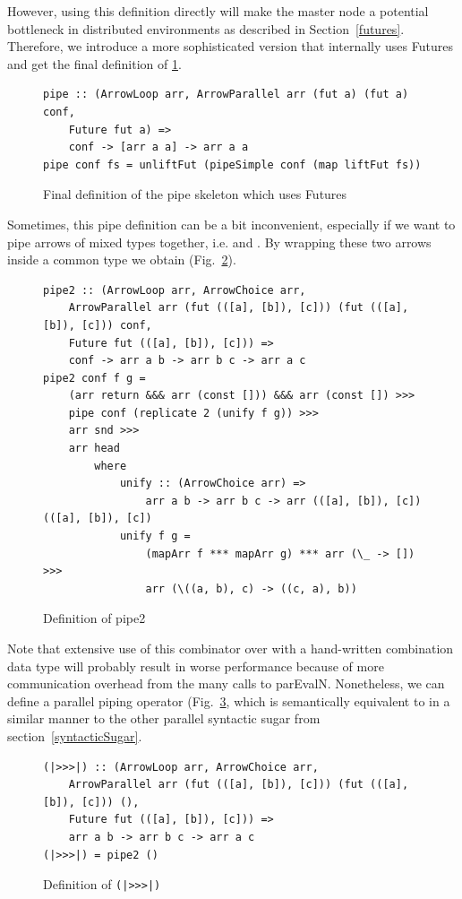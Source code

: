 However, using this definition directly will make the master node a potential bottleneck in distributed environments as described in Section~\ref{futures}. Therefore, we introduce a more sophisticated version that internally uses Futures and get the final definition of  \ref{fig:pipe}.
\begin{figure}[h]
\begin{lstlisting}[frame=htrbl]
pipe :: (ArrowLoop arr, ArrowParallel arr (fut a) (fut a) conf,
	Future fut a) =>
	conf -> [arr a a] -> arr a a
pipe conf fs = unliftFut (pipeSimple conf (map liftFut fs))
\end{lstlisting}
\caption{Final definition of the pipe skeleton which uses Futures}
\label{fig:pipe}
\end{figure}

Sometimes, this pipe definition can be a bit inconvenient, especially if we want to pipe arrows of mixed types together, i.e.  and . By wrapping these two arrows inside a common type we obtain  (Fig.~\ref{fig:pipe2}).
\begin{figure}[h]
\begin{lstlisting}[frame=htrbl]
pipe2 :: (ArrowLoop arr, ArrowChoice arr,
	ArrowParallel arr (fut (([a], [b]), [c])) (fut (([a], [b]), [c])) conf,
	Future fut (([a], [b]), [c])) =>
	conf -> arr a b -> arr b c -> arr a c
pipe2 conf f g = 
	(arr return &&& arr (const [])) &&& arr (const []) >>>
	pipe conf (replicate 2 (unify f g)) >>>
	arr snd >>>
	arr head
		where
			unify :: (ArrowChoice arr) =>
				arr a b -> arr b c -> arr (([a], [b]), [c]) (([a], [b]), [c])
			unify f g =
				(mapArr f *** mapArr g) *** arr (\_ -> []) >>>
				arr (\((a, b), c) -> ((c, a), b))
\end{lstlisting}
\caption{Definition of pipe2}
\label{fig:pipe2}
\end{figure}

Note that extensive use of this combinator over  with a hand-written combination data type will probably result in worse performance because of more communication overhead from the many calls to parEvalN. Nonetheless, we can define a parallel piping operator \code{(|>>>|)} (Fig.~\ref{fig:|>>>|}, which is semantically equivalent to \code{(>>>)} in a similar manner to the other parallel syntactic sugar from section~\ref{syntacticSugar}.
\begin{figure}[h]
\begin{lstlisting}[frame=htrbl]
(|>>>|) :: (ArrowLoop arr, ArrowChoice arr,
	ArrowParallel arr (fut (([a], [b]), [c])) (fut (([a], [b]), [c])) (),
	Future fut (([a], [b]), [c])) =>
	arr a b -> arr b c -> arr a c
(|>>>|) = pipe2 ()
\end{lstlisting}
\caption{Definition of \texttt{(|>>>|)}}
\label{fig:|>>>|}
\end{figure}

